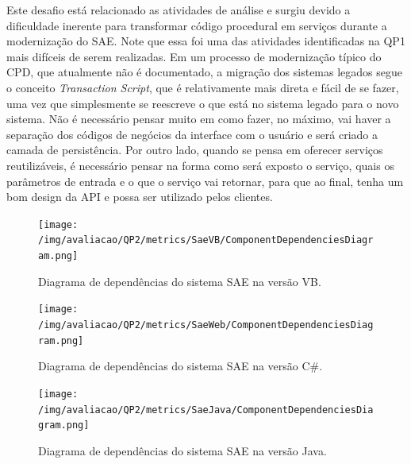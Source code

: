 \begin{itemize}
Este desafio está relacionado as atividades de análise e surgiu devido a dificuldade inerente para transformar código procedural em serviços durante a modernização do \acrshort{SAE}. Note que essa foi uma das atividades identificadas na QP1 mais difíceis de serem realizadas. Em um processo de modernização típico do CPD, que atualmente não é documentado, a migração dos sistemas legados segue o conceito \textit{Transaction Script}, que é relativamente mais direta e fácil de se fazer, uma vez que simplesmente se reescreve o que está no sistema legado para o novo sistema. Não é necessário pensar muito em como fazer, no máximo, vai haver a separação dos códigos de negócios da interface com o usuário e será criado a camada de persistência. Por outro lado, quando se pensa em oferecer serviços reutilizáveis, é necessário pensar na forma como será exposto o serviço, quais os parâmetros de entrada e o que o serviço vai retornar, para que ao final, tenha um bom design da \acrshort{API} e possa ser utilizado pelos clientes.

\end{itemize}




\begin{figure}[htb]
\centering
\texttt{[image: /img/avaliacao/QP2/metrics/SaeVB/ComponentDependenciesDiagram.png]}
\caption{Diagrama de dependências do sistema \acrshort{SAE} na versão VB.}
\label{fig:dependency_diagram_sae_vb}
\end{figure}



\begin{figure}[htb]
\centering
\texttt{[image: /img/avaliacao/QP2/metrics/SaeWeb/ComponentDependenciesDiagram.png]}
\caption{Diagrama de dependências do sistema \acrshort{SAE} na versão C\#.}
\label{fig:dependency_diagram_sae_csharp}
\end{figure}



\begin{figure}[htb]
\centering
\texttt{[image: /img/avaliacao/QP2/metrics/SaeJava/ComponentDependenciesDiagram.png]}
\caption{Diagrama de dependências do sistema \acrshort{SAE} na versão Java.}
\label{fig:dependency_diagram_sae_java}
\end{figure}


